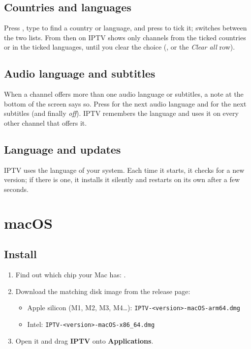 \subsection{Countries and languages}
Press , type to find a country or language, and press  to
tick it;  switches between the two lists. From then on IPTV shows
only channels from the ticked countries or in the ticked languages, until
you clear the choice (, or the \emph{Clear all} row).

\subsection{Audio language and subtitles}
When a channel offers more than one audio language or subtitles, a note at
the bottom of the screen says so. Press  for the next audio language
and  for the next subtitles (and finally \emph{off}). IPTV remembers
the language and uses it on every other channel that offers it.

\subsection{Language and updates}
IPTV uses the language of your system. Each time it starts, it checks for a
new version; if there is one, it installs it silently and restarts on its
own after a few seconds.

\section{macOS}

\subsection{Install}
\begin{enumerate}
  \item Find out which chip your Mac has: .
  \item Download the matching disk image from the release page:
  \begin{itemize}
    \item Apple silicon (M1, M2, M3, M4\ldots):
          \texttt{IPTV-\textless version\textgreater-macOS-arm64.dmg}
    \item Intel: \texttt{IPTV-\textless version\textgreater-macOS-x86\_64.dmg}
  \end{itemize}
  \item Open it and drag \textbf{IPTV} onto \textbf{Applications}.
\end{enumerate}


